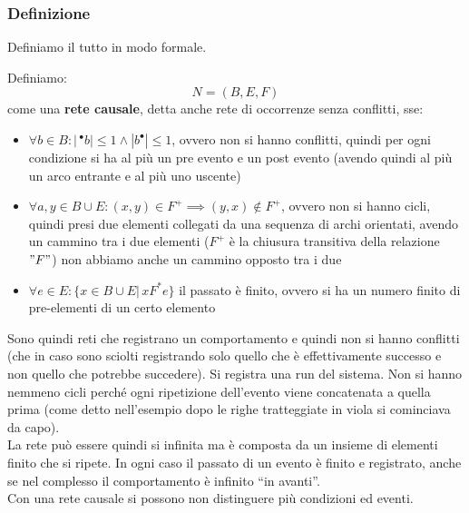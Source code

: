 \subsubsection{Definizione}
Definiamo il tutto in modo formale.
\begin{definizione}
  Definiamo:
  \[N=(B, E, F)\]
  come una \textbf{rete causale}, detta anche rete di occorrenze senza conflitti,
  sse:
  \begin{itemize}
    \item $\forall b\in B:|\,^{\bullet}b|\leq 1\land |b^{\bullet}|\leq 1$, ovvero
    non si hanno conflitti, quindi per ogni condizione si ha al più un pre
    evento e un post evento (avendo quindi al più un arco entrante e al più uno
    uscente)
    
    \item $\forall a, y\in B\cup E:(x, y)\in F^+\implies (y, x)\not\in F^+$, ovvero
    non si hanno cicli, quindi presi due elementi collegati da una sequenza di
    archi orientati, avendo un cammino tra i due elementi ($F^+$ è la chiusura
    transitiva della relazione $"F"$) non abbiamo anche un cammino opposto tra i due
    \item $\forall e\in E:\{x\in B\cup E|\, xF^*e\}$ il passato è finito, ovvero si ha un
    numero finito di pre-elementi di un certo elemento
  \end{itemize}
\end{definizione} \vspace{5mm} %
  Sono quindi reti che registrano un comportamento e quindi non si hanno
  conflitti (che in caso sono sciolti registrando solo quello che è
  effettivamente successo e non quello che potrebbe succedere). Si registra una
  run del sistema. Non si hanno nemmeno cicli perché ogni ripetizione
  dell'evento viene concatenata a quella prima (come detto nell'esempio dopo le
  righe tratteggiate in viola si cominciava da capo).\\
  La rete può essere quindi si infinita ma è composta da un insieme di elementi
  finito che si ripete. In ogni caso il passato di un evento è finito e
  registrato, anche se nel complesso il comportamento è infinito ``in
  avanti''. \\
  Con una rete causale si possono non distinguere più condizioni ed eventi.
